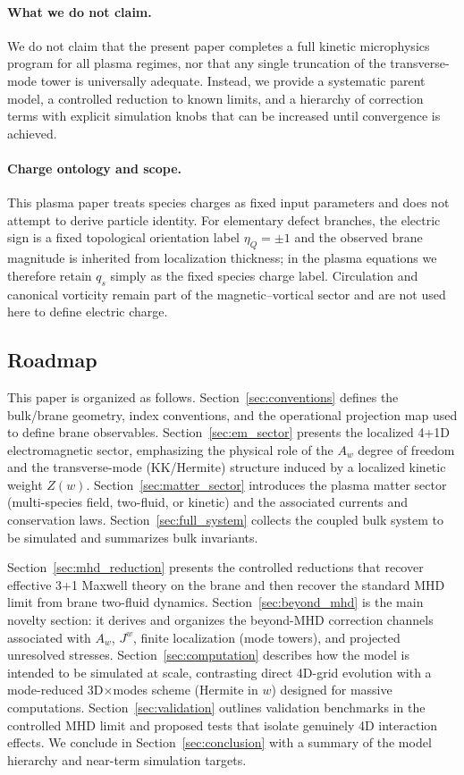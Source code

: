 \documentclass[11pt]{article}
\begin{document}
\paragraph{What we do not claim.}
We do not claim that the present paper completes a full kinetic microphysics program for all plasma regimes, nor that any single truncation of the transverse-mode tower is universally adequate. Instead, we provide a systematic parent model, a controlled reduction to known limits, and a hierarchy of correction terms with explicit simulation knobs that can be increased until convergence is achieved.

\paragraph{Charge ontology and scope.}
This plasma paper treats species charges as fixed input parameters and does not attempt to derive particle identity. For elementary defect branches, the electric sign is a fixed topological orientation label \(\eta_Q=\pm 1\) and the observed brane magnitude is inherited from localization thickness; in the plasma equations we therefore retain \(q_s\) simply as the fixed species charge label. Circulation and canonical vorticity remain part of the magnetic--vortical sector and are not used here to define electric charge.

\subsection{Roadmap}
This paper is organized as follows. Section~\ref{sec:conventions} defines the bulk/brane geometry, index conventions, and the operational projection map used to define brane observables. Section~\ref{sec:em_sector} presents the localized 4+1D electromagnetic sector, emphasizing the physical role of the \(A_w\) degree of freedom and the transverse-mode (KK/Hermite) structure induced by a localized kinetic weight \(Z(w)\). Section~\ref{sec:matter_sector} introduces the plasma matter sector (multi-species field, two-fluid, or kinetic) and the associated currents and conservation laws. Section~\ref{sec:full_system} collects the coupled bulk system to be simulated and summarizes bulk invariants.

Section~\ref{sec:mhd_reduction} presents the controlled reductions that recover effective 3+1 Maxwell theory on the brane and then recover the standard MHD limit from brane two-fluid dynamics. Section~\ref{sec:beyond_mhd} is the main novelty section: it derives and organizes the beyond-MHD correction channels associated with \(A_w\), \(J^w\), finite localization (mode towers), and projected unresolved stresses. Section~\ref{sec:computation} describes how the model is intended to be simulated at scale, contrasting direct 4D-grid evolution with a mode-reduced 3D\(\times\)modes scheme (Hermite in \(w\)) designed for massive computations. Section~\ref{sec:validation} outlines validation benchmarks in the controlled MHD limit and proposed tests that isolate genuinely 4D interaction effects. We conclude in Section~\ref{sec:conclusion} with a summary of the model hierarchy and near-term simulation targets.
\end{document}
